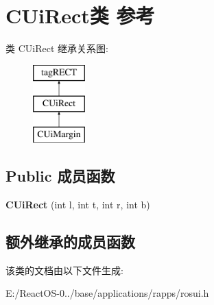 \hypertarget{class_c_ui_rect}{}\section{C\+Ui\+Rect类 参考}
\label{class_c_ui_rect}
类 C\+Ui\+Rect 继承关系图\+:\begin{figure}[H]
\begin{center}
\leavevmode
\includegraphics[height=3.000000cm]{class_c_ui_rect}
\end{center}
\end{figure}
\subsection*{Public 成员函数}
\begin{DoxyCompactItemize}
\item 
\mbox{\label{class_c_ui_rect_a7c712b4eea5884103686bb464e1fe04b}} 
{\bfseries C\+Ui\+Rect} (int l, int t, int r, int b)
\end{DoxyCompactItemize}
\subsection*{额外继承的成员函数}


该类的文档由以下文件生成\+:\begin{DoxyCompactItemize}
\item 
E\+:/\+React\+O\+S-\/0../base/applications/rapps/rosui.\+h\end{DoxyCompactItemize}
